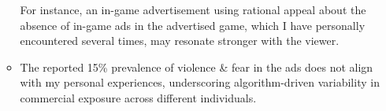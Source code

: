 \documentclass[a4paper, 12pt, mla]{homework}
\begin{document}
\begin{abibliography}
\begin{itemize}
\begin{itemize}
					For instance, an in-game advertisement using rational appeal about the absence of in-game ads in the advertised game, which I have personally encountered several times, may resonate stronger with the viewer.
				\item %
					The reported 15\% prevalence of violence \& fear in the ads does not align with my personal experiences, underscoring algorithm-driven variability in commercial exposure across different individuals. 
			\end{itemize}
	\end{itemize}



\end{abibliography}
\end{document}
